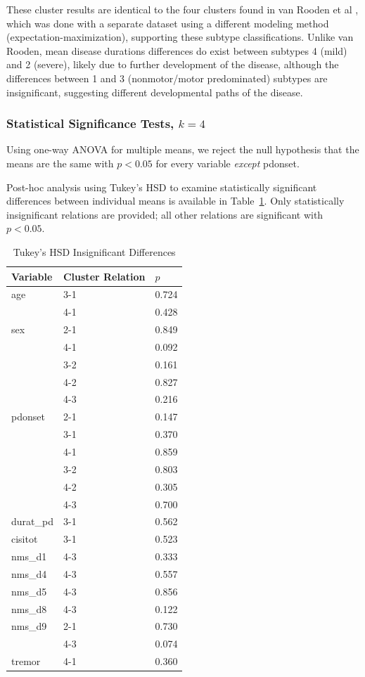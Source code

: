 \documentclass[letterpaper,12pt]{article}
\begin{document}
These cluster results are identical to the four clusters found in van Rooden et
al \cite{vanrooden10}, which was done with a separate dataset using a different
modeling method (expectation-maximization), supporting these subtype
classifications. Unlike van Rooden, mean disease durations differences do exist
between subtypes 4 (mild) and 2 (severe), likely due to further development of
the disease, although the differences between 1 and 3 (nonmotor/motor
predominated) subtypes are insignificant, suggesting different developmental
paths of the disease.

\subsubsection{Statistical Significance Tests, $k = 4$}
Using one-way ANOVA for multiple means, we reject the null
hypothesis that the means are the same with $p < 0.05$ for every variable
\emph{except} pdonset.

Post-hoc analysis using Tukey's HSD to examine statistically significant
differences between individual means is available in Table~\ref{tab:tukeyhsd}.
Only statistically insignificant relations are provided; all other relations
are significant with $p < 0.05$.

\begin{table}[h]
  \centering
  \begin{tabular}{l|l|l}
  Variable & Cluster Relation & $p$ \\
  \hline
  age & 3-1 & 0.724 \\
      & 4-1 & 0.428 \\
  \hline
  sex & 2-1 & 0.849 \\
      & 4-1 & 0.092 \\
      & 3-2 & 0.161 \\
      & 4-2 & 0.827 \\
      & 4-3 & 0.216 \\
  \hline
  pdonset & 2-1 & 0.147 \\
          & 3-1 & 0.370 \\
          & 4-1 & 0.859 \\
          & 3-2 & 0.803 \\
          & 4-2 & 0.305 \\
          & 4-3 & 0.700 \\
  \hline
  durat\_pd & 3-1 & 0.562 \\
  \hline
  cisitot & 3-1 & 0.523 \\
  \hline
  nms\_d1 & 4-3 & 0.333 \\
  \hline
  nms\_d4 & 4-3 & 0.557 \\
  \hline
  nms\_d5 & 4-3 & 0.856 \\
  \hline
  nms\_d8 & 4-3 & 0.122 \\
  \hline
  nms\_d9 & 2-1 & 0.730 \\
         & 4-3 & 0.074 \\
  \hline
  tremor & 4-1 & 0.360 \\
  \end{tabular}
  \caption{Tukey's HSD Insignificant Differences}
  \label{tab:tukeyhsd}
\end{table}
\end{document}
